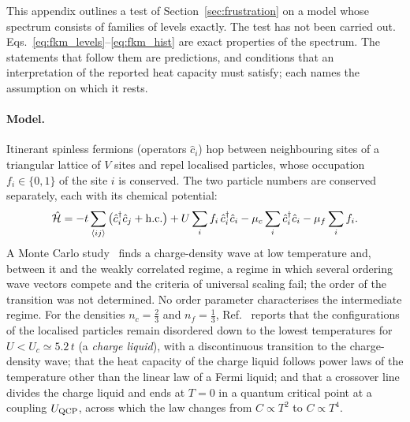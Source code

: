 \documentclass[10pt,a4paper]{article}
\theoremstyle{plain}
\begin{document}
This appendix outlines a test of Section~\ref{sec:frustration} on a model
whose spectrum consists of families of levels exactly. The test has not been
carried out. Eqs.~\eqref{eq:fkm_levels}--\eqref{eq:fkm_hist} are exact
properties of the spectrum. The statements that follow them are predictions,
and conditions that an interpretation of the reported heat capacity must
satisfy; each names the assumption on which it rests.

\paragraph{Model.} Itinerant spinless fermions (operators $\hat c_i$) hop
between neighbouring sites of a triangular lattice of $V$ sites and repel
localised particles, whose occupation $f_i\in\{0,1\}$ of the site $i$ is
conserved. The two particle numbers are conserved separately, each with its
chemical potential:
\begin{equation}\label{eq:fkm_H}
  \hat{\mathcal H}=-t\sum_{\langle ij\rangle}\big(\hat c_i^{\dagger}\hat c_j+{\rm h.c.}\big)
  +U\sum_i f_i\,\hat c_i^{\dagger}\hat c_i
  -\mu_c\sum_i\hat c_i^{\dagger}\hat c_i-\mu_f\sum_i f_i .
\end{equation}
A Monte Carlo study~\cite{NejatiLenk2026} finds a charge-density wave at low
temperature and, between it and the weakly correlated regime, a regime in
which several ordering wave vectors compete and the criteria of universal
scaling fail; the order of the transition was not determined. No order
parameter characterises the intermediate regime. For the densities
$n_c=\tfrac23$ and $n_f=\tfrac13$, Ref.~\cite{Oliveira2019} reports that
the configurations of the localised particles remain disordered down to the
lowest temperatures for $U<U_c\simeq5.2\,t$ (a \emph{charge liquid}), with a
discontinuous transition to the charge-density wave; that the heat capacity
of the charge liquid follows power laws of the temperature other than the
linear law of a Fermi liquid; and that a crossover line divides the charge
liquid and ends at $T=0$ in a quantum critical point at a coupling
$U_{\rm QCP}$, across which the law changes from $C\propto T^{2}$ to
$C\propto T^{4}$.
\end{document}
